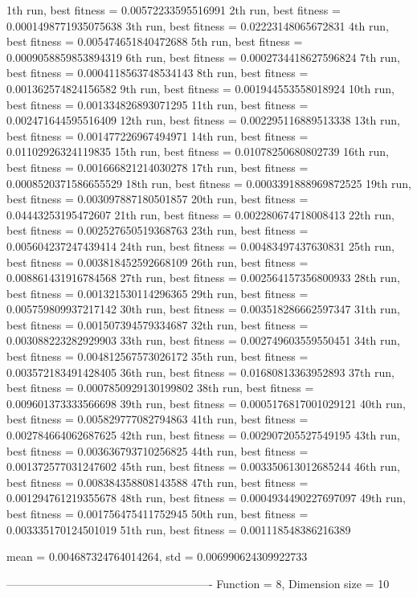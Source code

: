 1th run, best fitness = 0.00572233595516991
2th run, best fitness = 0.0001498771935075638
3th run, best fitness = 0.02223148065672831
4th run, best fitness = 0.005474651840472688
5th run, best fitness = 0.0009058859853894319
6th run, best fitness = 0.0002734418627596824
7th run, best fitness = 0.0004118563748534143
8th run, best fitness = 0.001362574824156582
9th run, best fitness = 0.001944553558018924
10th run, best fitness = 0.001334826893071295
11th run, best fitness = 0.002471644595516409
12th run, best fitness = 0.002295116889513338
13th run, best fitness = 0.001477226967494971
14th run, best fitness = 0.01102926324119835
15th run, best fitness = 0.01078250680802739
16th run, best fitness = 0.001666821214030278
17th run, best fitness = 0.0008520371586655529
18th run, best fitness = 0.0003391888969872525
19th run, best fitness = 0.003097887180501857
20th run, best fitness = 0.04443253195472607
21th run, best fitness = 0.002280674718008413
22th run, best fitness = 0.002527650519368763
23th run, best fitness = 0.005604237247439414
24th run, best fitness = 0.00483497437630831
25th run, best fitness = 0.003818452592668109
26th run, best fitness = 0.008861431916784568
27th run, best fitness = 0.002564157356800933
28th run, best fitness = 0.001321530114296365
29th run, best fitness = 0.005759809937217142
30th run, best fitness = 0.003518286662597347
31th run, best fitness = 0.001507394579334687
32th run, best fitness = 0.003088223282929903
33th run, best fitness = 0.002749603559550451
34th run, best fitness = 0.004812567573026172
35th run, best fitness = 0.003572183491428405
36th run, best fitness = 0.01680813363952893
37th run, best fitness = 0.0007850929130199802
38th run, best fitness = 0.009601373333566698
39th run, best fitness = 0.0005176817001029121
40th run, best fitness = 0.005829777082794863
41th run, best fitness = 0.002784664062687625
42th run, best fitness = 0.002907205527549195
43th run, best fitness = 0.003636793710256825
44th run, best fitness = 0.001372577031247602
45th run, best fitness = 0.003350613012685244
46th run, best fitness = 0.008384358808143588
47th run, best fitness = 0.001294761219355678
48th run, best fitness = 0.0004934490227697097
49th run, best fitness = 0.001756475411752945
50th run, best fitness = 0.003335170124501019
51th run, best fitness = 0.001118548386216389

mean = 0.004687324764014264, std = 0.006990624309922733

-------------------------------------------------------
Function = 8, Dimension size = 10

